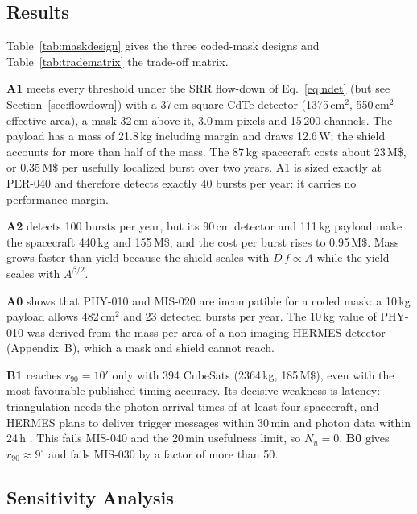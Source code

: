 \subsection{Results}

Table~\ref{tab:maskdesign} gives the three coded-mask designs and
Table~\ref{tab:tradematrix} the trade-off matrix.




\textbf{A1} meets every threshold under the SRR flow-down of Eq.~\eqref{eq:ndet} (but see
Section~\ref{sec:flowdown}) with a 37\,cm square CdTe detector (1375\,cm$^2$,
550\,cm$^2$ effective area), a mask 32\,cm above it, 3.0\,mm pixels and 15\,200 channels.
The payload has a mass of 21.8\,kg including margin and draws 12.6\,W; the shield accounts
for more than half of the mass. The 87\,kg spacecraft costs about 23\,M\$, or 0.35\,M\$ per
usefully localized burst over two years. A1 is sized exactly at PER-040 and therefore
detects exactly 40 bursts per year: it carries no performance margin.

\textbf{A2} detects 100 bursts per year, but its 90\,cm detector and 111\,kg payload make the
spacecraft 440\,kg and 155\,M\$, and the cost per burst rises to 0.95\,M\$. Mass grows
faster than yield because the shield scales with $D\,f\propto A$ while the yield scales with
$A^{\beta/2}$.

\textbf{A0} shows that PHY-010 and MIS-020 are incompatible for a coded mask: a 10\,kg
payload allows 482\,cm$^2$ and 23 detected bursts per year. The 10\,kg value of PHY-010 was
derived from the mass per area of a non-imaging HERMES detector (Appendix~B), which a mask
and shield cannot reach.

\textbf{B1} reaches $r_{90}=10'$ only with 394 CubeSats (2364\,kg, 185\,M\$), even with the
most favourable published timing accuracy. Its decisive weakness is latency: triangulation
needs the photon arrival times of at least four spacecraft, and HERMES plans to deliver
trigger messages within 30\,min and photon data within 24\,h \cite{Fiore2024}. This fails
MIS-040 and the 20\,min usefulness limit, so $N_u=0$. \textbf{B0} gives
$r_{90}\approx9^\circ$ and fails MIS-030 by a factor of more than 50.

\subsection{Sensitivity Analysis}



